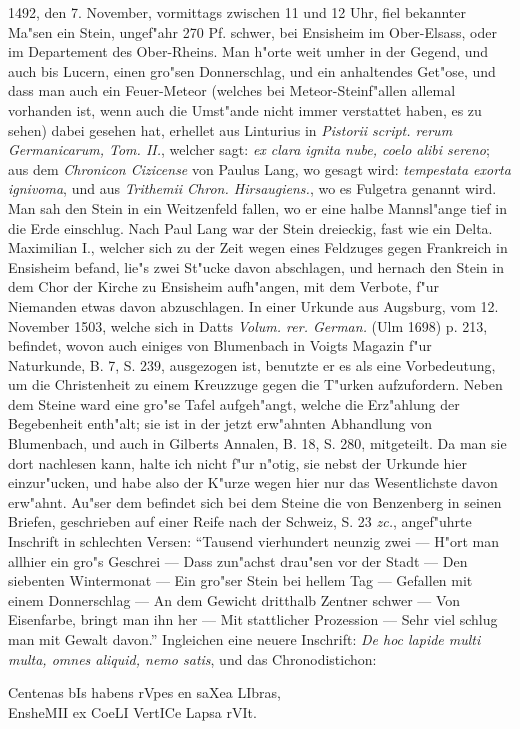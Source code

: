 \documentclass[a4paper, 11pt, oneside, polutonikogreek, german]{article}
\begin{document}
1492, den 7. November, vormittags zwischen 11 und 12 Uhr, fiel bekannter Ma"sen ein Stein, ungef"ahr 270 Pf. schwer, bei Ensisheim im Ober-Elsass, oder im Departement des Ober-Rheins. Man h"orte weit umher in der Gegend, und auch bis Lucern, einen gro"sen Donnerschlag, und ein anhaltendes Get"ose, und dass man auch ein Feuer-Meteor (welches bei Meteor-Steinf"allen allemal vorhanden ist, wenn auch die Umst"ande nicht immer verstattet haben, es zu sehen) dabei gesehen hat, erhellet aus Linturius in \emph{Pistorii script. rerum Germanicarum, Tom. II.}, welcher sagt: \emph{ex clara ignita nube, coelo alibi sereno}; aus dem \emph{Chronicon Cizicense} von Paulus Lang, wo gesagt wird: \emph{tempestata exorta ignivoma}, und aus \emph{Trithemii Chron. Hirsaugiens.}, wo es Fulgetra genannt wird. Man sah den Stein in ein Weitzenfeld fallen, wo er eine halbe Mannsl"ange tief in die Erde einschlug. Nach Paul Lang war der Stein dreieckig, fast wie ein Delta. Maximilian I., welcher sich zu der Zeit wegen eines Feldzuges gegen Frankreich in Ensisheim befand, lie"s zwei St"ucke davon abschlagen, und hernach den Stein in dem Chor der Kirche zu Ensisheim aufh"angen, mit dem Verbote, f"ur Niemanden etwas davon abzuschlagen. In einer Urkunde aus Augsburg, vom 12. November 1503, welche sich in Datts \emph{Volum. rer. German.} (Ulm 1698) p. 213, befindet, wovon auch einiges von Blumenbach in Voigts Magazin f"ur Naturkunde, B. 7, S. 239, ausgezogen ist, benutzte er es als eine Vorbedeutung, um die Christenheit zu einem Kreuzzuge gegen die T"urken aufzufordern. Neben dem Steine ward eine gro"se Tafel aufgeh"angt, welche die Erz"ahlung der Begebenheit enth"alt; sie ist in der jetzt erw"ahnten Abhandlung von Blumenbach, und auch in Gilberts Annalen, B. 18, S. 280, mitgeteilt. Da man sie dort nachlesen kann, halte ich nicht f"ur n"otig, sie nebst der Urkunde hier einzur"ucken, und habe also der K"urze wegen hier nur das Wesentlichste davon erw"ahnt. Au"ser dem befindet sich bei dem Steine die von Benzenberg in seinen Briefen, geschrieben auf einer Reife nach der Schweiz, S. 23 \emph{zc.}, angef"uhrte Inschrift in schlechten Versen: "`Tausend vierhundert neunzig zwei --- H"ort man allhier ein gro"s Geschrei --- Dass zun"achst drau"sen vor der Stadt --- Den siebenten Wintermonat --- Ein gro"ser Stein bei hellem Tag --- Gefallen mit einem Donnerschlag --- An dem Gewicht dritthalb Zentner schwer --- Von Eisenfarbe, bringt man ihn her --- Mit stattlicher Prozession --- Sehr viel schlug man mit Gewalt davon."' Ingleichen eine neuere Inschrift: \emph{De hoc lapide multi multa, omnes aliquid, nemo satis}, und das Chronodistichon:
\begin{center}
Centenas bIs habens rVpes en saXea LIbras,\\
EnsheMII ex CoeLI VertICe Lapsa rVIt.
\end{center}
\end{document}
